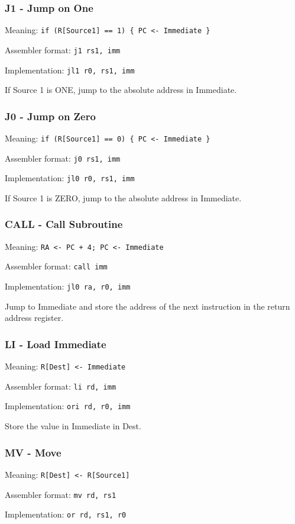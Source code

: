 \documentclass{article}
\begin{document}
\subsubsection{J1 - Jump on One}
Meaning: \verb|if (R[Source1] == 1) { PC <- Immediate }|

Assembler format: \verb|j1 rs1, imm|

Implementation: \verb|jl1 r0, rs1, imm|

If Source 1 is ONE, jump to the absolute address in Immediate.

\subsubsection{J0 - Jump on Zero}
Meaning: \verb|if (R[Source1] == 0) { PC <- Immediate }|

Assembler format: \verb|j0 rs1, imm|

Implementation: \verb|jl0 r0, rs1, imm|

If Source 1 is ZERO, jump to the absolute address in Immediate.

\subsubsection{CALL - Call Subroutine}
Meaning: \verb|RA <- PC + 4; PC <- Immediate|

Assembler format: \verb|call imm|

Implementation: \verb|jl0 ra, r0, imm|

Jump to Immediate and store the address of the next instruction in the return address register.

\subsubsection{LI - Load Immediate}
Meaning: \verb|R[Dest] <- Immediate|

Assembler format: \verb|li rd, imm|

Implementation: \verb|ori rd, r0, imm|

Store the value in Immediate in Dest.

\subsubsection{MV - Move}
Meaning: \verb|R[Dest] <- R[Source1]|

Assembler format: \verb|mv rd, rs1|

Implementation: \verb|or rd, rs1, r0|
\end{document}
